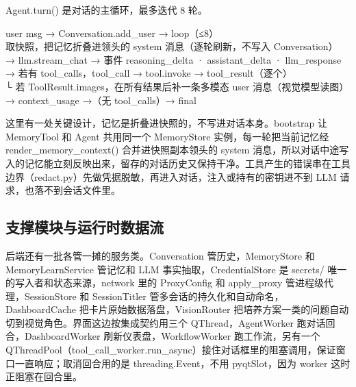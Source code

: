 \documentclass[UTF8,a4paper,11pt,fontset=none]{ctexart}
\newcommand{\code}[1]{{\ttfamily\small #1}}
\begin{document}
\code{Agent.turn()} 是对话的主循环，最多迭代 8 轮。

\begin{tcolorbox}[colback=codebg,colframe=rulegray,boxrule=0.5pt,left=6pt,right=6pt,top=3pt,bottom=3pt,arc=1.5pt]
\small\ttfamily
user msg → Conversation.add\_user → loop（≤8）\\
\hspace*{1.2em}取快照，把记忆折叠进领头的 system 消息（逐轮刷新，不写入 Conversation）\\
\hspace*{1.2em}→ llm.stream\_chat → 事件 reasoning\_delta · assistant\_delta · llm\_response\\
\hspace*{1.2em}→ 若有 tool\_calls，tool\_call → tool.invoke → tool\_result（逐个）\\
\hspace*{2.4em}└ 若 ToolResult.images，在所有结果后补一条多模态 user 消息（视觉模型读图）\\
\hspace*{1.2em}→ context\_usage →（无 tool\_calls）→ final
\end{tcolorbox}

这里有一处关键设计，记忆是折叠进快照的，不写进对话本身。\code{bootstrap} 让 \code{MemoryTool} 和 \code{Agent} 共用同一个 \code{MemoryStore} 实例，每一轮把当前记忆经 \code{render\_memory\_context()} 合并进快照副本领头的 system 消息，所以对话中途写入的记忆能立刻反映出来，留存的对话历史又保持干净。工具产生的错误串在工具边界（\code{redact.py}）先做凭据脱敏，再进入对话，注入或持有的密钥进不到 LLM 请求，也落不到会话文件里。

\subsection{支撑模块与运行时数据流}

后端还有一批各管一摊的服务类。\code{Conversation} 管历史，\code{MemoryStore} 和 \code{MemoryLearnService} 管记忆和 LLM 事实抽取，\code{CredentialStore} 是 \code{secrets/} 唯一的写入者和状态来源，\code{network} 里的 \code{ProxyConfig} 和 \code{apply\_proxy} 管进程级代理，\code{SessionStore} 和 \code{SessionTitler} 管多会话的持久化和自动命名，\code{DashboardCache} 把卡片原始数据落盘，\code{VisionRouter} 把培养方案一类的问题自动切到视觉角色。界面这边按集成契约用三个 \code{QThread}，\code{AgentWorker} 跑对话回合，\code{DashboardWorker} 刷新仪表盘，\code{WorkflowWorker} 跑工作流，另有一个 \code{QThreadPool}（\code{tool\_call\_worker.run\_async}）接住对话框里的阻塞调用，保证窗口一直响应；取消回合用的是 \code{threading.Event}，不用 \code{pyqtSlot}，因为 worker 这时正阻塞在回合里。
\end{document}
